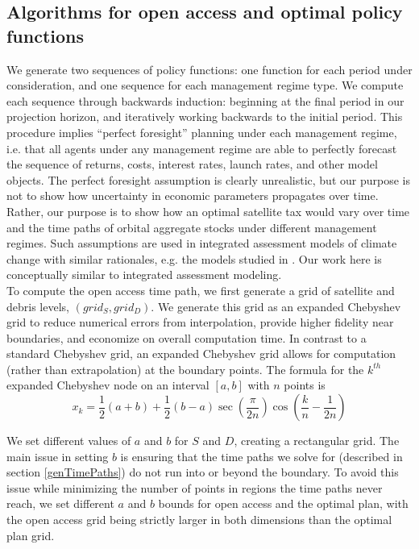 \documentclass[12pt]{article}
\begin{document}
\subsection{Algorithms for open access and optimal policy functions}

We generate two sequences of policy functions: one function for each period under consideration, and one sequence for each management regime type. We compute each sequence through backwards induction: beginning at the final period in our projection horizon, and iteratively working backwards to the initial period. This procedure implies ``perfect foresight'' planning under each management regime, i.e. that all agents under any management regime are able to perfectly forecast the sequence of returns, costs, interest rates, launch rates, and other model objects. The perfect foresight assumption is clearly unrealistic, but our purpose is not to show how uncertainty in economic parameters propagates over time. Rather, our purpose is to show how an optimal satellite tax would vary over time and the time paths of orbital aggregate stocks under different management regimes. Such assumptions are used in integrated assessment models of climate change with similar rationales, e.g. the models studied in \citet{kellykolstad1999, nordhaus2013, IAMsummary}. Our work here is conceptually similar to integrated assessment modeling. \\

To compute the open access time path, we first generate a grid of satellite and debris levels, $(grid_S,grid_D)$. We generate this grid as an expanded Chebyshev grid to reduce numerical errors from interpolation, provide higher fidelity near boundaries, and economize on overall computation time. In contrast to a standard Chebyshev grid, an expanded Chebyshev grid allows for computation (rather than extrapolation) at the boundary points. The formula for the $k^{th}$ expanded Chebyshev node on an interval $[a,b]$ with $n$ points is
\[ x_k = \frac{1}{2}(a+b) + \frac{1}{2}(b-a)\sec\left( \frac{\pi}{2n} \right) \cos\left( \frac{k}{n} - \frac{1}{2n} \right) \]

We set different values of $a$ and $b$ for $S$ and $D$, creating a rectangular grid. The main issue in setting $b$ is ensuring that the time paths we solve for (described in section \ref{genTimePaths}) do not run into or beyond the boundary. To avoid this issue while minimizing the number of points in regions the time paths never reach, we set different $a$ and $b$ bounds for open access and the optimal plan, with the open access grid being strictly larger in both dimensions than the optimal plan grid. \\ 
\end{document}
